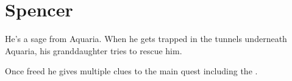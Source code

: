 \section{Spencer}
\label{char:spencer}


He’s a sage from Aquaria. When he gets trapped in the tunnels underneath Aquaria, his granddaughter  tries to rescue him.

Once freed he gives multiple clues to the main quest including the .
